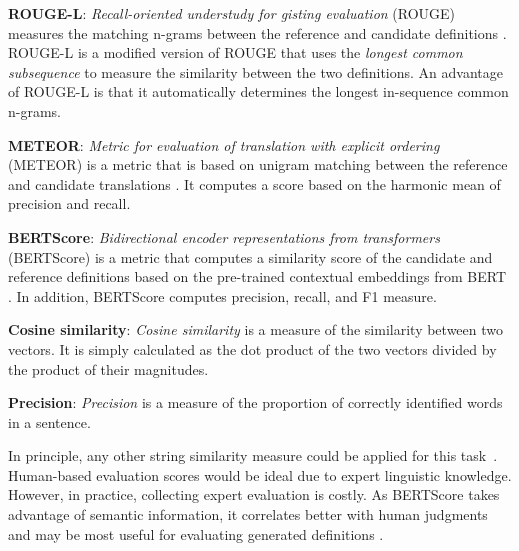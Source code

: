 \noindent\textbf{ROUGE-L}: \textit{Recall-oriented understudy for gisting evaluation}
(ROUGE) measures the matching n-grams between the reference and candidate
definitions \cite{lin_2004_rouge}. ROUGE-L is a modified version of ROUGE that
uses the \textit{longest common subsequence} to measure the similarity between
the two definitions. An advantage of ROUGE-L is that it automatically determines
the longest in-sequence common n-grams.

\noindent\textbf{METEOR}: \textit{Metric for evaluation of translation with explicit
    ordering} (METEOR) is a metric that is based on unigram matching between the
reference and candidate translations \cite{banerjee_2005_meteor}. It
computes a score based on the harmonic mean of precision and recall.

\noindent\textbf{BERTScore}: \textit{Bidirectional encoder representations from
    transformers} (BERTScore) is a metric that computes a similarity score of
the candidate and reference definitions based on the pre-trained contextual
embeddings from BERT \cite{zhang_bertscore_2020}. In addition, BERTScore
computes precision, recall, and F1 measure.

\noindent\textbf{Cosine similarity}: \textit{Cosine similarity} is a measure of the
similarity between two vectors. It is simply calculated as the dot product of
the two vectors divided by the product of their magnitudes.

\noindent\textbf{Precision}: \textit{Precision} is a measure of the proportion of
correctly identified words in a sentence.

In principle, any other string similarity measure could be applied for this task~\cite{gali_2019_framework}. Human-based evaluation scores would be ideal due to
expert linguistic knowledge. However, in practice, collecting expert evaluation
is costly. As BERTScore takes advantage of semantic information, it correlates
better with human judgments and may be most useful for evaluating generated
definitions \cite{zhang_bertscore_2020}.


